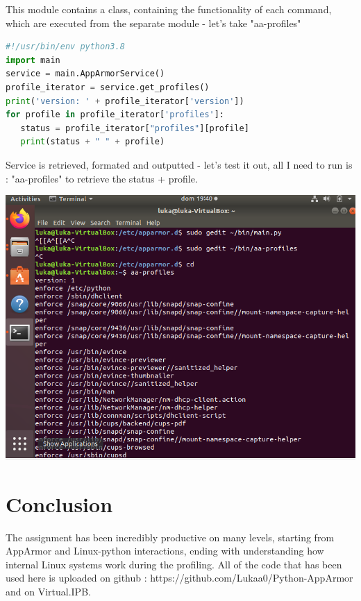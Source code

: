 \documentclass[12pt,a4paper]{article} %
\begin{document}
This module contains a class, containing the functionality of each command, which are executed from the separate module - let's take "aa-profiles"
\begin{mdframed}[backgroundcolor=light-gray, roundcorner=10pt,leftmargin=1, rightmargin=1, innerleftmargin=15, innertopmargin=15,innerbottommargin=15, outerlinewidth=1, linecolor=light-gray] \begin{lstlisting}[language=python]
#!/usr/bin/env python3.8
import main
service = main.AppArmorService()
profile_iterator = service.get_profiles()
print('version: ' + profile_iterator['version'])
for profile in profile_iterator['profiles']:
   status = profile_iterator["profiles"][profile]
   print(status + " " + profile)
\end{lstlisting} \end{mdframed}
Service is retrieved, formated and outputted - let's test it out, all I need to run is : "aa-profiles" to retrieve the status + profile.

    \includegraphics[width=\textwidth]{snip1.2.PNG}
\section{Conclusion}
The assignment has been incredibly productive on many levels, starting from AppArmor and Linux-python interactions, ending with understanding how internal Linux systems work during the profiling.
All of the code that has been used here is uploaded on github : https://github.com/Lukaa0/Python-AppArmor and on Virtual.IPB.
\end{document}
